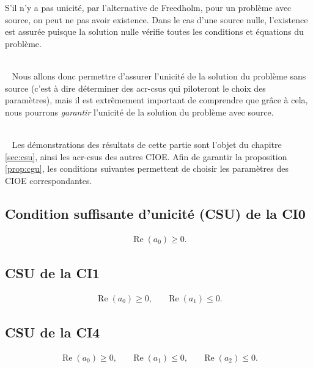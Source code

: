 \documentclass[12pt,%
    twoside,%
    a4paper,%
    openright, %
    ]{book}
\numberwithin{equation}{section} %
\renewcommand{\Re}{\operatorname{Re}}
\begin{document}
  S'il n'y a pas unicité, par l'alternative de Freedholm,  pour un problème avec source, on peut ne pas avoir existence.
  Dans le cas d'une source nulle, l'existence est assurée puisque la solution nulle vérifie toutes les conditions et équations du problème.

  {~}\\{~}
  Nous allons donc permettre d'assurer l'unicité de la solution du problème sans source (c'est à dire déterminer des \glspl{acr-csu} qui piloteront le choix des paramètres), mais il est extrêmement important de comprendre que grâce à cela, nous pourrons \emph{garantir} l'unicité de la solution du problème avec source.

  {~}\\{~}
  Les démonstrations des résultats de cette partie sont l'objet du chapitre \ref{sec:csu}, ainsi les \glspl{acr-csu} des autres CIOE.
  Afin de garantir la proposition \ref{prop:cgu}, les conditions suivantes permettent de choisir les paramètres des CIOE correspondantes.

  \subsection{Condition suffisante d'unicité (CSU) de la CI0}
    \begin{align*}
      \Re(a_0) \ge 0.
    \end{align*}
  
  \subsection{CSU de la CI1}
    \begin{align*}
      \Re(a_0) \ge 0,&& \Re(a_1) \le 0.
    \end{align*}

  \subsection{CSU de la CI4}
    \begin{align*}
      \Re(a_0) \ge 0,&& \Re(a_1) \le 0,&& \Re(a_2) \le 0.
    \end{align*}



\backmatter
\appendix
\printbibliography
\end{document}
